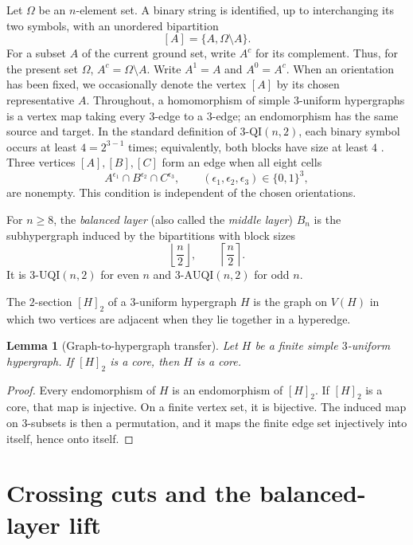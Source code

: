 \documentclass[11pt]{article}
\newtheorem{lemma}[theorem]{Lemma}
\begin{document}
Let \(\Omega\) be an \(n\)-element set.  A binary string is identified, up to
interchanging its two symbols, with an unordered bipartition
\[
[A]=\{A,\Omega\setminus A\}.
\]
For a subset \(A\) of the current ground set, write \(A^c\) for its
complement.  Thus, for the present set \(\Omega\),
\(A^c=\Omega\setminus A\).  Write \(A^1=A\) and \(A^0=A^c\).  When an
orientation has been fixed, we occasionally denote the vertex \([A]\) by its
chosen representative \(A\).  Throughout, a homomorphism
of simple \(3\)-uniform hypergraphs is a vertex map taking every \(3\)-edge
to a \(3\)-edge; an endomorphism has the same source and target.
In the standard definition of \(3\text{-}\mathrm{QI}(n,2)\), each binary
symbol occurs at least \(4=2^{3-1}\) times; equivalently, both blocks have
size at least \(4\) \cite{ThomasAkhtar2026}.  Three vertices
\([A],[B],[C]\) form an edge when all eight cells
\[
A^{\epsilon_1}\cap B^{\epsilon_2}\cap C^{\epsilon_3},
\qquad
(\epsilon_1,\epsilon_2,\epsilon_3)\in\{0,1\}^3,
\]
are nonempty.  This condition is independent of the chosen orientations.

For \(n\ge8\), the \emph{balanced layer} (also called the \emph{middle
layer}) \(B_n\) is the subhypergraph induced
by the bipartitions with block
sizes
\[
\left\lfloor\frac n2\right\rfloor,
\qquad
\left\lceil\frac n2\right\rceil.
\]
It is \(3\text{-}\mathrm{UQI}(n,2)\) for even \(n\) and
\(3\text{-}\mathrm{AUQI}(n,2)\) for odd \(n\).

The \(2\)-section \([H]_2\) of a \(3\)-uniform hypergraph \(H\) is the
graph on \(V(H)\) in which two vertices are adjacent when they lie together
in a hyperedge.

\begin{lemma}[Graph-to-hypergraph transfer]\label{lem:transfer}
Let \(H\) be a finite simple \(3\)-uniform hypergraph.  If \([H]_2\) is a
core, then \(H\) is a core.
\end{lemma}

\begin{proof}
Every endomorphism of \(H\) is an endomorphism of \([H]_2\).  If
\([H]_2\) is a core, that map is injective.  On a finite vertex set, it is
bijective.  The induced map on \(3\)-subsets is then a permutation, and it
maps the finite edge set injectively into itself, hence onto itself.
\end{proof}

\section{Crossing cuts and the balanced-layer lift}
\end{document}
